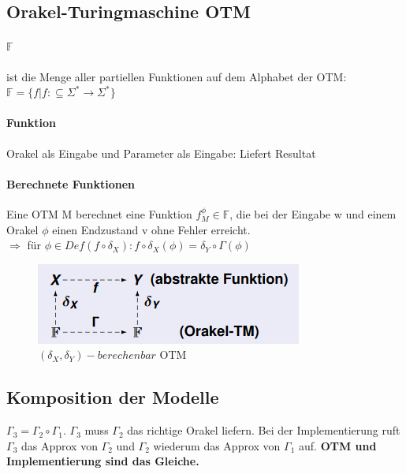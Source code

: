 \documentclass[ngerman]{scrartcl}
\begin{document}
\subsection{Orakel-Turingmaschine OTM}
\paragraph{$ \mathbb{F} $}
ist die Menge aller partiellen Funktionen auf dem Alphabet der OTM: \\
 $ \mathbb{F} = \{ f | f: \subseteq \Sigma^* \rightarrow  \Sigma^* \}$
\paragraph{Funktion} Orakel als Eingabe und Parameter als Eingabe: Liefert Resultat

\paragraph{Berechnete Funktionen}
Eine OTM M berechnet eine Funktion $ f_M^\phi \in \mathbb{F}$, die bei der Eingabe w und einem Orakel $ \phi $ einen Endzustand v ohne Fehler erreicht. \\ $\Rightarrow$ für $ \phi \in Def(f\circ \delta_X) : f \circ \delta_X(\phi) = \delta_Y \circ \Gamma(\phi) $

\begin{figure}[h]
  \centering
  \includegraphics{orakelname.PNG}
  \caption{$ (\delta_X, \delta_Y)-berechenbar$ OTM}
\end{figure}


\subsection{Komposition der Modelle}
$ \Gamma_3 = \Gamma_2 \circ \Gamma_1 $. $ \Gamma_3 $ muss $ \Gamma_2 $ das richtige Orakel liefern. Bei der Implementierung ruft $ \Gamma_3 $ das Approx von $ \Gamma_2 $ und $ \Gamma_2 $ wiederum das Approx von $ \Gamma_1 $ auf. \textbf{OTM und Implementierung sind das Gleiche.}
\end{document}
